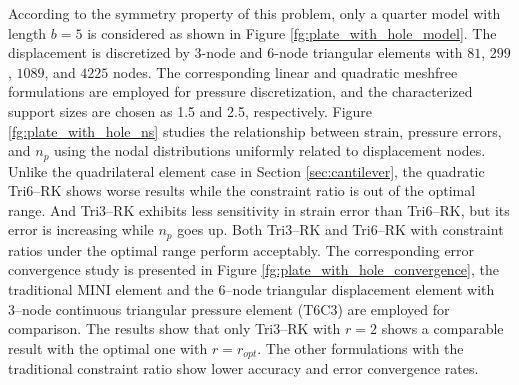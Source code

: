 According to the symmetry property of this problem, only a quarter model with length $b=5$ is considered as shown in Figure \ref{fg:plate_with_hole_model}. The displacement is discretized by 3-node and 6-node triangular elements with $81$, $299$, $1089$, and $4225$ nodes. The corresponding linear and quadratic meshfree formulations are employed for pressure discretization, and the characterized support sizes are chosen as 1.5 and 2.5, respectively.
Figure \ref{fg:plate_with_hole_ns} studies the relationship between strain, pressure errors, and $n_p$ using the nodal distributions uniformly related to displacement nodes.
Unlike the quadrilateral element case in Section \ref{sec:cantilever}, the quadratic Tri6--RK shows worse results while the constraint ratio is out of the optimal range. And Tri3--RK exhibits less sensitivity in strain error than Tri6--RK, but its error is increasing while $n_p$ goes up. Both Tri3--RK and Tri6--RK with constraint ratios under the optimal range perform acceptably. 
The corresponding error convergence study is presented in Figure \ref{fg:plate_with_hole_convergence}, the traditional MINI element and the 6--node triangular displacement element with 3--node continuous triangular pressure element (T6C3) are employed for comparison. The results show that only Tri3--RK with $r=2$ shows a comparable result with the optimal one with $r=r_{opt}$. The other formulations with the traditional constraint ratio show lower accuracy and error convergence rates.



